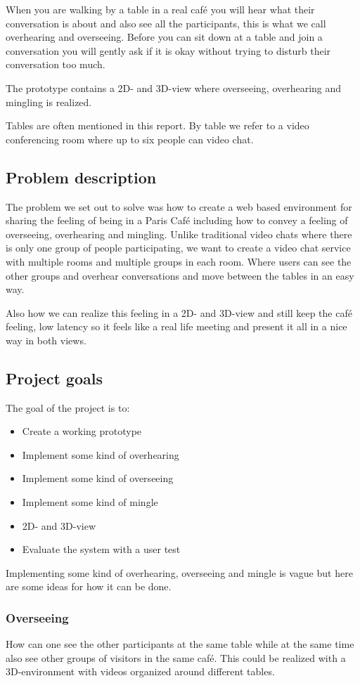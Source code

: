 \documentclass[12pt, titlepage]{article}
\begin{document}
When you are walking by a table in a real café you will hear what their conversation is about and also see all the participants, this is what we call overhearing and overseeing. Before you can sit down at a table and join a conversation you will gently ask if it is okay without trying to disturb their conversation too much.

The prototype contains a 2D- and 3D-view where overseeing, overhearing and mingling is realized.

Tables are often mentioned in this report. By table we refer to a video conferencing room where up to six people can video chat.
\subsection{Problem description}
The problem we set out to solve was how to create a web based environment for sharing the feeling of being in a Paris Café including how to convey a feeling of overseeing, overhearing and mingling. Unlike traditional video chats where there is only one group of people participating, we want to create a video chat service with multiple rooms and multiple groups in each room. Where users can see the other groups and overhear conversations and move between the tables in an easy way.

Also how we can realize this feeling in a 2D- and 3D-view and still keep the café feeling, low latency so it feels like a real life meeting and present it all in a nice way in both views.
\subsection{Project goals}
The goal of the project is to:
\begin{itemize}
  \item Create a working prototype
  \item Implement some kind of overhearing
  \item Implement some kind of overseeing
  \item Implement some kind of mingle
  \item 2D- and 3D-view
  \item Evaluate the system with a user test
\end{itemize}
Implementing some kind of overhearing, overseeing and mingle is vague but here are some ideas for how it can be done.
\subsubsection{Overseeing}
How can one see the other participants at the same table while at the same time also see other groups of visitors in the same café. This could be realized with a 3D-environment with videos organized around different tables.
\end{document}
